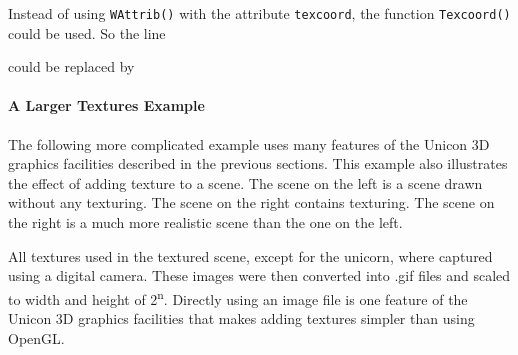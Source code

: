 
Instead of using \texttt{WAttrib()} with the attribute \texttt{texcoord},
the function \texttt{Texcoord()} could be used. So the line 


\noindent
could be replaced by 


\paragraph[A Larger Textures Example]{A Larger Textures Example}
The following more complicated example uses many features of
the Unicon 3D graphics facilities described in the previous sections.
This example also illustrates the effect of adding texture to a scene.
The scene on the left is a scene drawn without any texturing.
The scene on the right contains texturing. The scene on the right is a
much more realistic scene than the one on the left. 

All textures used in the textured scene, except for the unicorn, where
captured using a digital camera. These images were then converted into
.gif files and scaled to width and height of 2\textsuperscript{n}.
Directly using an image file is one feature of the Unicon 3D graphics
facilities that makes adding textures simpler than using OpenGL. 

\bigskip

